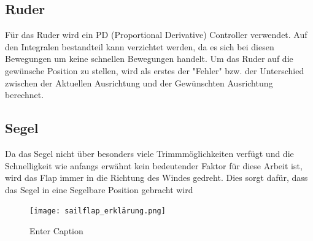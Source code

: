 \subsection{Ruder}
Für das Ruder wird ein PD (Proportional Derivative) Controller verwendet. Auf den Integralen bestandteil kann verzichtet werden, da es sich bei diesen Bewegungen um keine schnellen Bewegungen handelt. 
Um das Ruder auf die gewünsche Position zu stellen, wird als erstes der "Fehler" bzw. der Unterschied zwischen der Aktuellen Ausrichtung und der Gewünschten Ausrichtung berechnet. 

\subsection{Segel}
Da das Segel nicht über besonders viele Trimmmöglichkeiten verfügt und die Schnelligkeit wie anfangs erwähnt kein bedeutender Faktor für diese Arbeit ist, wird das Flap immer in die Richtung des Windes gedreht. Dies sorgt dafür, dass das Segel in eine Segelbare Position gebracht wird 

\begin{figure}[H]
    \centering
    \texttt{[image: sailflap\_erklärung.png]}
    \caption{Enter Caption}
    \label{fig:enter-label}
\end{figure}

 







